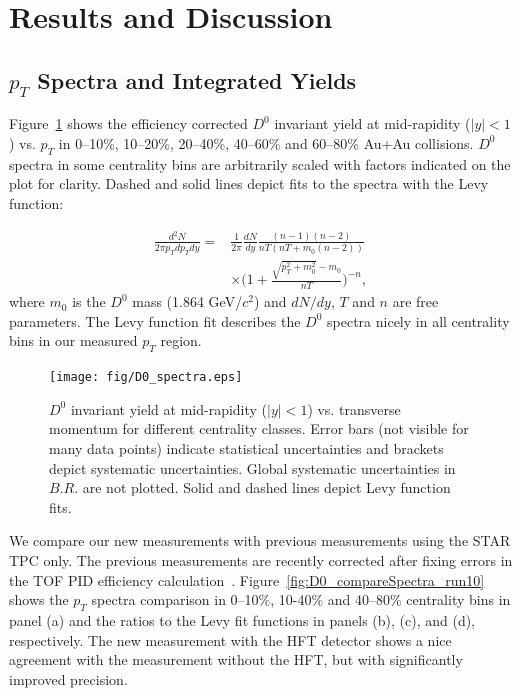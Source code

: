 \documentclass[%
 reprint,	
 amsmath,amssymb,
 aps,
 prc,
]{revtex4-1}
\begin{document}

\section{Results and Discussion}
\label{result}

\subsection{$p_{T}$ Spectra and Integrated Yields}
\label{result:pt}

Figure~\ref{fig:D0_spectra} shows the efficiency corrected $D^0$ invariant yield at mid-rapidity ($|y|<1$) vs. $p_{T}$ in 0--10\%, 10--20\%, 20--40\%, 40--60\% and 60--80\% Au+Au collisions. $D^0$ spectra in some centrality bins are arbitrarily scaled with factors indicated on the plot for clarity. Dashed and solid lines depict fits to the spectra with the Levy function:

\begin{equation}
  \begin{aligned}
    \frac{d^2N}{2\pi p_{T}dp_{T}dy} = 
   & \frac{1}{2\pi}\frac{dN}{dy}\frac{(n-1)(n-2)}{nT(nT+m_0(n-2))} \\
  & \times \bigg(1+\frac{\sqrt{p_{T}^2+m_0^2}-m_0}{nT}\bigg)^{-n},
  \end{aligned}
\label{equ:equation4}
\end{equation}
where $m_0$ is the $D^0$ mass (1.864 GeV/$c^2$) and $dN/dy$, $T$ and $n$ are free parameters. The Levy function fit describes the $D^0$ spectra nicely in all centrality bins in our measured $p_T$ region.


\begin{figure}
\centering
\texttt{[image: fig/D0\_spectra.eps]}
\caption{$D^{0}$ invariant yield at mid-rapidity ($|y|<1$) vs. transverse momentum for different centrality classes. Error bars (not visible for many data points) indicate statistical uncertainties and brackets depict systematic uncertainties. Global systematic uncertainties in $B.R.$ are not plotted. Solid and dashed lines depict Levy function fits.}
\label{fig:D0_spectra} 
\end{figure}


We compare our new measurements with previous measurements using the STAR TPC only. The previous measurements are recently corrected after fixing errors in the TOF PID efficiency calculation~\cite{Star_D_RAA}. Figure~\ref{fig:D0_compareSpectra_run10} shows the $p_{T}$ spectra comparison in 0--10\%, 10-40\% and 40--80\% centrality bins in panel (a) and the ratios to the Levy fit functions in panels (b), (c), and (d), respectively. The new measurement with the HFT detector shows a nice agreement with the measurement without the HFT, but with significantly improved precision.
\end{document}
